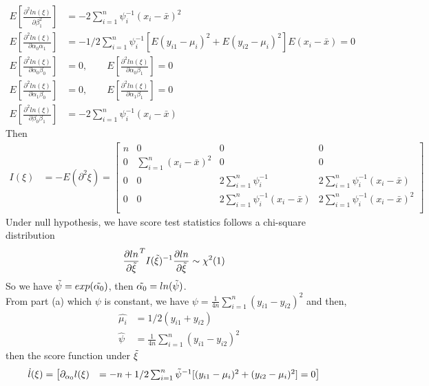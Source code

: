 \documentclass[11pt]{article} %
\begin{document}
\begin{itemize}
\begin{align*}
		E[\frac{ \partial^2 ln(\xi)}{\partial \beta_1^2}] &= - 2\sum_{i=1}^n \psi_i^{-1}(x_i-\bar{x})^2\\
		E[\frac{ \partial^2 ln(\xi)}{\partial \alpha_0\alpha_1}] &= -1/2  \sum_{i=1}^n \psi_i^{-1} [E(y_{i1}-\mu_i)^2 + E(y_{i2}-\mu_i)^2]E(x_i-\bar{x}) = 0\\
		E[\frac{ \partial^2 ln(\xi)}{\partial \alpha_0\beta_0}] &= 0,\qquad
		E[\frac{ \partial^2 ln(\xi)}{\partial \alpha_0\beta_1}] =  0\\
		E[\frac{ \partial^2 ln(\xi)}{\partial \alpha_1\beta_0}] &=  0,\qquad
		E[\frac{ \partial^2 ln(\xi)}{\partial \alpha_1\beta_1}] =  0\\
		E[\frac{ \partial^2 ln(\xi)}{\partial \beta_0\beta_1}] &=  - 2 \sum_{i=1}^n \psi_i^{-1} (x_i-\bar{x}) 
	\end{align*}
	Then
	\begin{align*}
		I(\xi) &= -E (\partial^2 \xi)= \begin{bmatrix}
			n & 0&  0 &  0\\
			0 & \sum_{i=1}^n (x_i-\bar{x})^2 & 0  & 0 \\
			0 & 0&  2\sum_{i=1}^n \psi_i^{-1}  & 2 \sum_{i=1}^n \psi_i^{-1} (x_i-\bar{x}) \\
			0 &  0& 2 \sum_{i=1}^n \psi_i^{-1} (x_i-\bar{x})   & 2\sum_{i=1}^n \psi_i^{-1}(x_i-\bar{x})^2  \\
		\end{bmatrix}
	\end{align*} 
	Under null hypothesis, we have score test statistics follows a chi-square distribution
	\begin{align*}
		\frac{\partial ln}{\partial \Tilde{\xi}}^T I(\Tilde{\xi})^{-1} \frac{\partial ln}{\partial \Tilde{\xi}} & \sim \chi^2(1)
	\end{align*} 
	So we have $\Tilde{\psi} = exp(\Tilde{\alpha_0}) $, then $\Tilde{\alpha_0} = ln(\Tilde{\psi}) $.\\
	From part (a) which $\psi$ is constant, we have $\psi = \frac{1}{4n} \sum_{i=1}^n (y_{i1}- y_{i2})^2$ and then,
	\begin{align*}
		\hat{\mu_i} &= 1/2 (y_{i1}+ y_{i2})\\
		\hat{\psi} &=  \frac{1}{4n} \sum_{i=1}^n  (y_{i1}-y_{i2})^2
	\end{align*}
	then the score function under $\Tilde{\xi}$
	\begin{align*}
		\dot{l}(\xi) &= \begin{bmatrix}
			\partial_{\alpha_0} l(\xi) &= - n + 1/2  \sum_{i=1}^n \Tilde{\psi}^{-1} [(y_{i1}-\mu_i)^2 + (y_{i2}-\mu_i)^2] =0 \\

\end{bmatrix}
\end{align*}
\end{itemize}
\end{document}
